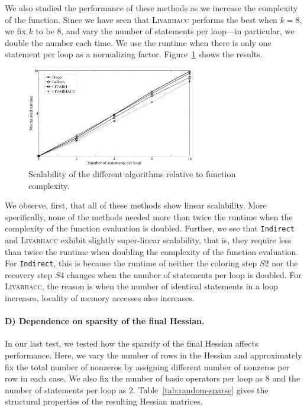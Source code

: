 \documentclass[12pt]{article}
\begin{document}
{We also studied the performance of these methods as we increase the complexity of the function. Since we have seen that \textsc{Livarhacc} performs the best when $k=8$, we fix $k$ to be $8$, and vary the number of statements per loop---in particular, we double the number each time. 
We use the runtime when there is only one statement per loop as a normalizing factor. 
Figure~\ref{fig:random-fig3} shows the results. 
\begin{figure}[htbp]
        \centering
        \includegraphics[width=0.65\textwidth]{figures/HRfig3BW}
        \caption[Scalability of the Different Algorithms Relative to Function Complexity]
                     {Scalability of the different algorithms relative to function complexity.}
        \label{fig:random-fig3}
\end{figure}

We observe, first, that all of these methods show linear scalability. More specifically, none of the methods needed more than twice the runtime when the complexity of the function evaluation is doubled. Further, we see that {\tt Indirect} and \textsc{Livarhacc} exhibit slightly super-linear scalability, that is, they require less than twice the runtime when doubling the complexity of the function evaluation. For {\tt Indirect}, this is because the runtime of neither the coloring step $S2$ nor the recovery step $S4$  changes when the number of statements per loop is doubled. For \textsc{Livarhacc}, the reason is when the number of identical statements in a loop increases, locality of memory accesses also increases. 


\paragraph{D) Dependence on sparsity of the final Hessian.}

In our last test, we tested how the sparsity of the final Hessian affects performance. Here, we vary the number of rows in the Hessian and approximately fix the total number of nonzeros by assigning different number of nonzeros per row in each case. We also fix the number of basic operators per loop as $8$ and the number of statements per loop as $2$. Table~\ref{tab:random-sparse} gives the structural properties of the resulting Hessian matrices.

}
\end{document}
